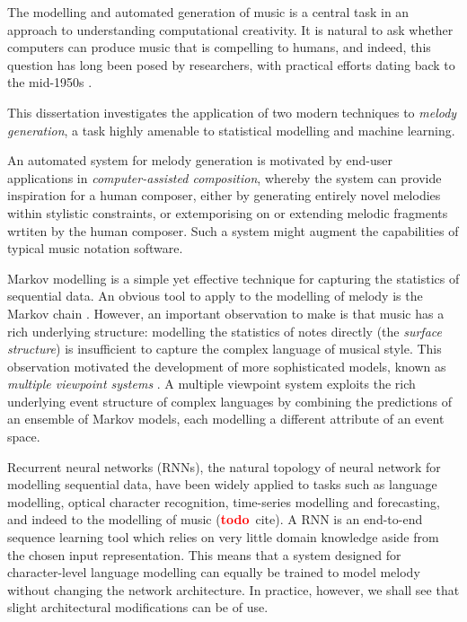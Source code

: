\documentclass[12pt,a4paper,twoside,openright]{report}
\newcommand{\todo}{\textcolor{red}{\textbf{todo}~}}
\begin{document}
The modelling and automated generation of music is a central task in an approach
to understanding computational creativity. It is natural to ask whether
computers can produce music that is compelling to humans, and indeed, this
question has long been posed by researchers, with practical efforts dating back
to the mid-1950s \cite{ames1987automated}. 

This dissertation investigates the application of two modern techniques to
\emph{melody generation}, a task highly amenable to statistical
modelling and machine learning. 

An automated system for melody generation is motivated by end-user applications
in \emph{computer-assisted composition}, whereby the system can provide
inspiration for a human composer, either by generating entirely novel melodies
within stylistic constraints, or extemporising on or extending melodic
fragments wrtiten by the human composer. Such a system might augment the
capabilities of typical music notation software. 

Markov modelling is a simple yet effective technique for capturing the
statistics of sequential data. An obvious tool to apply to the modelling of
melody is the Markov chain \cite{ames1989markov}. However, an important
observation to make is that music has a rich underlying structure: modelling the
statistics of notes directly (the \emph{surface structure}) is insufficient to
capture the complex language of musical style. This observation motivated the
development of more sophisticated models, known as \emph{multiple viewpoint
systems} \cite{conklin1995viewpoints}.  A multiple viewpoint system exploits the
rich underlying event structure of complex languages by combining the
predictions of an ensemble of Markov models, each modelling a different
attribute of an event space.

Recurrent neural networks (RNNs), the natural topology of neural network for
modelling sequential data, have been widely applied to tasks such as language
modelling, optical character recognition, time-series modelling and forecasting,
and indeed to the modelling of music (\todo cite). A RNN is an end-to-end
sequence learning tool which relies on very little domain knowledge aside from
the chosen input representation. This means that a system designed for
character-level language modelling can equally be trained to model melody
without changing the network architecture. In practice, however, we shall see
that slight architectural modifications can be of use.
\end{document}
